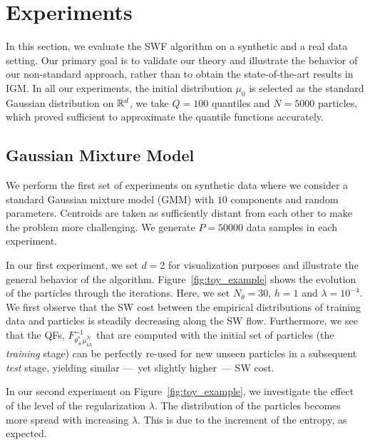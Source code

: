 \section{Experiments}


In this section, we evaluate the SWF algorithm on a synthetic and a real data setting. Our primary goal is to validate our theory and illustrate the behavior of our non-standard approach, rather than to obtain the state-of-the-art results in IGM. In all our experiments, the initial distribution $\mu_0$ is selected as the standard Gaussian distribution on $\mathbb{R}^d$, we take $Q=100$ quantiles and $N=5000$ particles, which proved sufficient to approximate the quantile functions accurately.


\subsection{Gaussian Mixture Model }
We perform the first set of experiments on synthetic data where we consider a standard Gaussian mixture model (GMM) with $10$ components and random parameters. Centroids are taken as sufficiently distant from each other to make the problem more challenging. We generate $P=50000$ data samples in each experiment.

In our first experiment, we set $d=2$ for visualization purposes and illustrate the general behavior of the algorithm. Figure~\ref{fig:toy_example} shows the evolution of the particles through the iterations. Here, we set $N_\theta=30$, $h=1$ and $\lambda=10^{-4}$.
We first observe that the SW cost between the empirical distributions of training data and particles is steadily decreasing along the SW flow. Furthermore, we see that the QFs, $F^{-1}_{\theta^*_\#\bar{\mu}_{kh}^{N}}$ that are computed with the initial set of particles (the \textit{training} stage) can be perfectly re-used for new unseen particles in a subsequent \textit{test} stage, yielding similar ---~yet slightly higher~--- SW cost.


In our second experiment on Figure~\ref{fig:toy_example}, we investigate the effect of the level of the regularization $\lambda$. The distribution of the particles becomes more spread with increasing $\lambda$. This is due to the increment of the entropy, as expected.

